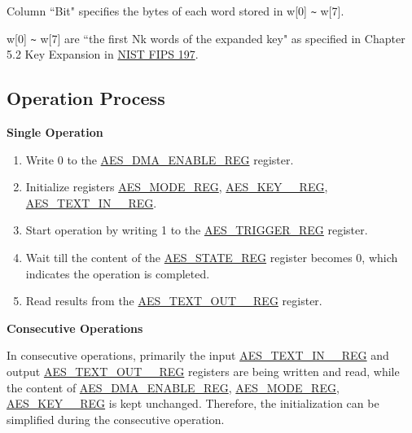 \documentclass[main\_\_EN.tex]{subfiles}
\begin{document}
\begin{landscape}
\begin{ThreePartTable}
\begin{longtable}[c]
\end{longtable}
\begin{tablenotes}
\item[1] Column ``Bit" specifies the bytes of each word stored in w[0] \verb+~+ w[7].
\item[2] w[0] \verb+~+ w[7] are ``the first Nk words of the expanded key" as specified in Chapter 5.2 Key Expansion in \href{https://nvlpubs.nist.gov/nistpubs/FIPS/NIST.FIPS.197.pdf}{NIST FIPS 197}.
\end{tablenotes}
\end{ThreePartTable}

\end{landscape}
\restoregeometry


\subsection{Operation Process }

\textbf{Single Operation}

\begin{enumerate}
    \item Write 0 to the \hyperref[regdesc:AESDMAENABLEREG]{AES\_DMA\_ENABLE\_REG} register.
    \item Initialize registers \hyperref[regdesc:AESMODEREG]{AES\_MODE\_REG}, \hyperref[regdesc:AESKEYnREG]{AES\_KEY\_\_REG}, \hyperref[regdesc:AESTEXTINnREG]{AES\_TEXT\_IN\_\_REG}.
    \item Start operation by writing 1 to the \hyperref[regdesc:AESTRIGGERREG]{AES\_TRIGGER\_REG} register.
    \item Wait till the content of the \hyperref[regdesc:AESSTATEREG]{AES\_STATE\_REG} register becomes 0, which indicates the operation is completed.
    \item Read results from the \hyperref[regdesc:AESTEXTOUTnREG]{AES\_TEXT\_OUT\_\_REG} register.
\end{enumerate}

\textbf{Consecutive Operations}

In consecutive operations, primarily the input \hyperref[regdesc:AESTEXTINnREG]{AES\_TEXT\_IN\_\_REG} and output \hyperref[regdesc:AESTEXTOUTnREG]{AES\_TEXT\_OUT\_\_REG} registers are being written and read, while the content of \hyperref[regdesc:AESDMAENABLEREG]{AES\_DMA\_ENABLE\_REG}, \hyperref[regdesc:AESMODEREG]{AES\_MODE\_REG}, \hyperref[regdesc:AESKEYnREG]{AES\_KEY\_\_REG}
is kept unchanged. Therefore, the initialization can be simplified during the consecutive operation.
\end{document}
